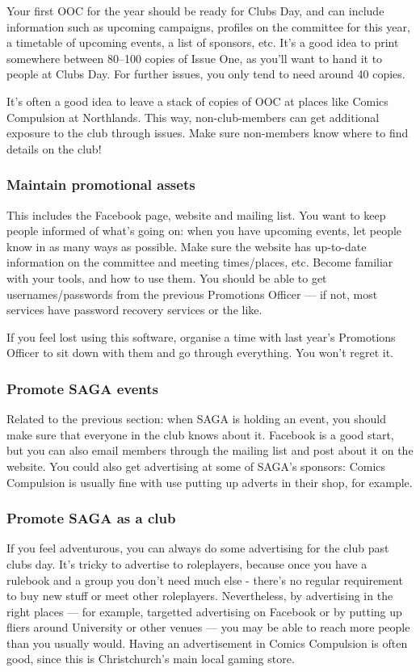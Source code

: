 Your first OOC for the year should be ready for Clubs Day, and can include information such as upcoming campaigns, profiles on the committee for this year, a timetable of upcoming events, a list of sponsors, etc. It's a good idea to print somewhere between 80--100 copies of Issue One, as you'll want to hand it to people at Clubs Day. For further issues, you only tend to need around 40 copies.

It's often a good idea to leave a stack of copies of OOC at places like Comics Compulsion at Northlands. This way, non-club-members can get additional exposure to the club through issues. Make sure non-members know where to find details on the club!

\subsubsection{Maintain promotional assets}

This includes the Facebook page, website and mailing list. You want to keep people informed of what's going on: when you have upcoming events, let people know in as many ways as possible. Make sure the website has up-to-date information on the committee and meeting times/places, etc. Become familiar with your tools, and how to use them. You should be able to get usernames/passwords from the previous Promotions Officer --- if not, most services have password recovery services or the like.

If you feel lost using this software, organise a time with last year's Promotions Officer to sit down with them and go through everything. You won't regret it.

\subsubsection{Promote SAGA events}

Related to the previous section: when SAGA is holding an event, you should make sure that everyone in the club knows about it. Facebook is a good start, but you can also email members through the mailing list and post about it on the website. You could also get advertising at some of SAGA's sponsors: Comics Compulsion is usually fine with use putting up adverts in their shop, for example.

\subsubsection{Promote SAGA as a club}

If you feel adventurous, you can always do some advertising for the club past clubs day. It's tricky to advertise to roleplayers, because once you have a rulebook and a group you don't need much else - there's no regular requirement to buy new stuff or meet other roleplayers. Nevertheless, by advertising in the right places --- for example, targetted advertising on Facebook or by putting up fliers around University or other venues --- you may be able to reach more people than you usually would. Having an advertisement in Comics Compulsion is often good, since this is Christchurch's main local gaming store.